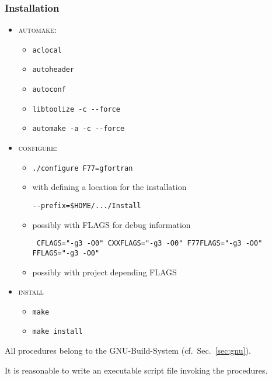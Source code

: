 \subsubsection{Installation}
\begin{itemize}
	\item \textsc{automake}:
	\begin{itemize}
		\item[] \begin{verbatim}aclocal\end{verbatim}
		\item[] \texttt{autoheader}
		\item[] \texttt{autoconf}
		\item[] \begin{verbatim}libtoolize -c --force\end{verbatim}
		\item[] \begin{verbatim}automake -a -c --force\end{verbatim}
	\end{itemize}
	\item \textsc{configure}: 
	\begin{itemize}
		\item[] \begin{verbatim}./configure F77=gfortran \end{verbatim}
        \item[] with defining a location for the installation 
                \begin{verbatim}--prefix=$HOME/.../Install\end{verbatim}
        \item[] possibly with FLAGS for debug information
		        \begin{verbatim} CFLAGS="-g3 -O0" CXXFLAGS="-g3 -O0" F77FLAGS="-g3 -O0" FFLAGS="-g3 -O0" \end{verbatim}
		\item[] possibly with project depending FLAGS
	\end{itemize}
	\item \textsc{install}
	\begin{itemize}	
		\item \begin{verbatim}make\end{verbatim}
		\item \begin{verbatim}make install\end{verbatim}
	\end{itemize}
\end{itemize}
All procedures belong to the GNU-Build-System (cf.~Sec.~\ref{sec:gnu}).\par
It is reasonable to write an executable script file invoking the procedures.

